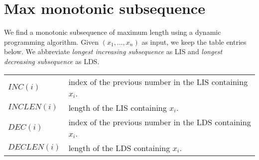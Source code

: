 \documentclass[12pt]{article}
\begin{document}
\section{Max monotonic subsequence}

We find a monotonic subsequence of maximum length using a dynamic programming
algorithm. Given $(x_1,\ldots,x_n)$ as input, we keep the table entries
below.
We abbreviate \textit{longest increasing subsequence} as LIS and
\textit{longest decreasing subsequence} as LDS.
\\
\begin{tabular}{|l|l|}
\hline
$INC(i)$ & index of the previous number in the LIS containing $x_i$.\\
$INCLEN(i)$ & length of the LIS containing $x_i$.\\
$DEC(i)$ & index of the previous number in the LDS containing $x_i$.\\
$DECLEN(i)$ & length of the LDS containing $x_i$.\\
\hline
\end{tabular}
\end{document}
